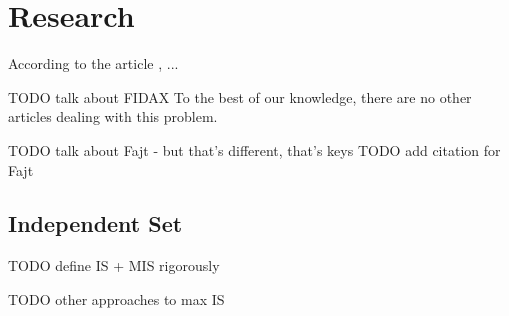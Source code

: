\chapter{Research}

According to the article \cite{fidax}, ...

TODO talk about FIDAX
To the best of our knowledge, there are no other articles dealing with this problem.

TODO talk about Fajt - but that's different, that's keys
TODO add citation for Fajt

\section{Independent Set}

TODO define IS + MIS rigorously

TODO other approaches to max IS
